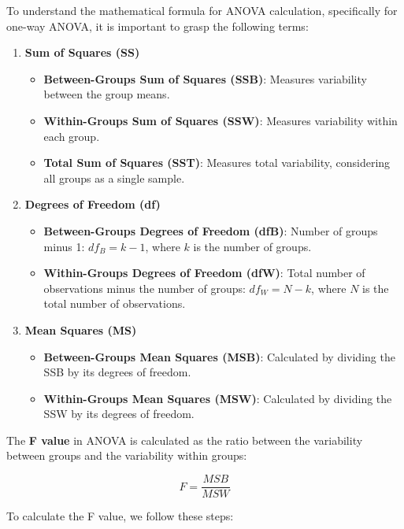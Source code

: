 \documentclass[conference]{IEEEtran}
\begin{document}
	To understand the mathematical formula for ANOVA calculation, specifically for one-way ANOVA, it is important to grasp the following terms:
	
	\begin{enumerate}
		\item \textbf{Sum of Squares (SS)}
		\begin{itemize}
			\item \textbf{Between-Groups Sum of Squares (SSB)}: Measures variability between the group means.
			\item \textbf{Within-Groups Sum of Squares (SSW)}: Measures variability within each group.
			\item \textbf{Total Sum of Squares (SST)}: Measures total variability, considering all groups as a single sample.
		\end{itemize}
		\item \textbf{Degrees of Freedom (df)}
		\begin{itemize}
			\item \textbf{Between-Groups Degrees of Freedom (dfB)}: Number of groups minus 1: \( df_B = k - 1 \), where \( k \) is the number of groups.
			\item \textbf{Within-Groups Degrees of Freedom (dfW)}: Total number of observations minus the number of groups: \( df_W = N - k \), where \( N \) is the total number of observations.
		\end{itemize}
		\item \textbf{Mean Squares (MS)}
		\begin{itemize}
			\item \textbf{Between-Groups Mean Squares (MSB)}: Calculated by dividing the SSB by its degrees of freedom.
			\item \textbf{Within-Groups Mean Squares (MSW)}: Calculated by dividing the SSW by its degrees of freedom.
		\end{itemize}
	\end{enumerate}
	
	The \textbf{F value} in ANOVA is calculated as the ratio between the variability between groups and the variability within groups:
	
	\[
	F = \frac{MSB}{MSW}
	\]
	
	To calculate the F value, we follow these steps:
	
\end{document}
